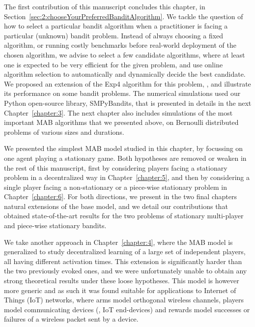 The first contribution of this manuscript concludes this chapter, in Section~\ref{sec:2:chooseYourPreferredBanditAlgorithm}.
We tackle the question of how to select a particular bandit algorithm when a practitioner is facing a particular (unknown) bandit problem.
Instead of always choosing a fixed algorithm, or running costly benchmarks before real-world deployment of the chosen algorithm, we advise to select a few candidate algorithms, where at least one is expected to be very efficient for the given problem, and use online algorithm selection to automatically and dynamically decide the best candidate.
We proposed an extension of the Exp4 algorithm for this problem, \Aggr, and illustrate its performance on some bandit problems.
%
The numerical simulations used our Python open-source library, SMPyBandits, that is presented in details in the next Chapter~\ref{chapter:3}.
The next chapter also includes simulations of the most important MAB algorithms that we presented above, on Bernoulli distributed problems of various sizes and durations.

We presented the simplest MAB model studied in this chapter, by focussing on one agent playing a stationary game.
Both hypotheses are removed or weaken in the rest of this manuscript,
first by considering players facing a stationary problem in a decentralized way in Chapter~\ref{chapter:5},
and then by considering a single player facing a non-stationary or a piece-wise stationary problem in Chapter~\ref{chapter:6}.
%
For both directions, we present in the two final chapters natural extensions of the base model, and we detail our contributions that obtained state-of-the-art results for the two problems
of stationary multi-player and piece-wise stationary bandits.

We take another approach in Chapter~\ref{chapter:4}, where the MAB model is generalized to study decentralized learning of a large set of independent players, all having different activation times.
This extension is significantly harder than the two previously evoked ones, and we were unfortunately unable to obtain any strong theoretical results under these loose hypotheses.
This model is however more generic and as such it was found suitable for applications to Internet of Things (IoT) networks, where arms model orthogonal wireless channels, players model communicating devices (\ie, IoT end-devices) and rewards model successes or failures of a wireless packet sent by a device.



